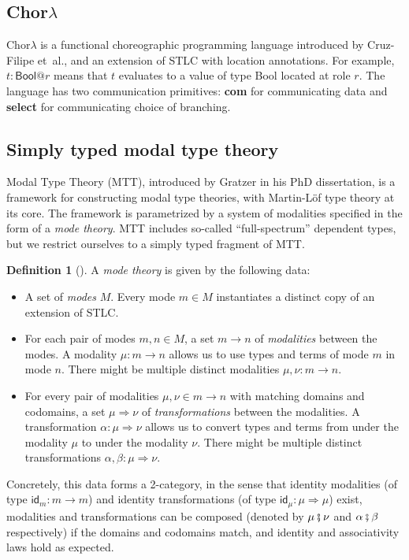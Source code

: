 \documentclass{scrartcl}
\theoremstyle{definition}
\newtheorem{definition}{Definition}
\theoremstyle{plain}
\newcommand{\primitive}[1]{\textsf{\textbf{#1}}}
\begin{document}
\subsection{\texorpdfstring{Chor$\lambda$}{ChorLambda}}
Chor$\lambda$\cite{cruz2022functional} is a functional choreographic
programming language introduced by Cruz-Filipe et~al., and an extension of STLC
with location annotations. For example, $t : \textsf{Bool} @ r$ means that $t$
evaluates to a value of type \textsf{Bool} located at role $r$. The language
has two communication primitives: \primitive{com} for communicating data and
\primitive{select} for communicating choice of branching.

\subsection{Simply typed modal type theory}
Modal Type Theory (MTT)\cite{gratzer2023syntax}, introduced by Gratzer in his
PhD dissertation, is a framework for constructing modal type theories, with
Martin-L\"{of} type theory at its core. The framework is parametrized by a
system of modalities specified in the form of a \emph{mode theory}. MTT
includes so-called ``full-spectrum'' dependent types, but we restrict ourselves
to a simply typed fragment of MTT.
\begin{definition}[{\cite[Chapter 6.1.1]{gratzer2023syntax}}]
  A \emph{mode theory} is given by the following data:
  \begin{itemize}
  \item
    A set of \emph{modes} $M$. Every mode $m \in M$ instantiates a distinct
    copy of an extension of STLC.
  \item
    For each pair of modes $m, n \in M$, a set $m \to n$ of \emph{modalities}
    between the modes. A modality $\mu : m \to n$ allows us to use types and
    terms of mode $m$ in mode $n$. There might be multiple distinct modalities
    $\mu , \nu : m \to n$.
  \item
    For every pair of modalities $\mu, \nu \in m \to n$ with matching domains
    and codomains, a set $\mu \Rightarrow \nu$ of \emph{transformations}
    between the modalities. A transformation $\alpha : \mu \Rightarrow \nu$
    allows us to convert types and terms from under the modality $\mu$ to under
    the modality $\nu$. There might be multiple distinct transformations
    $\alpha, \beta : \mu \Rightarrow \nu$.
  \end{itemize}
  Concretely, this data forms a 2-category, in the sense that identity
  modalities (of type $\textsf{id}_m : m \to m$) and identity transformations
  (of type $\textsf{id}_\mu : \mu \Rightarrow \mu $) exist, modalities and
  transformations can be composed (denoted by $\mu \fatsemi \nu$ and $\alpha
  \fatsemi \beta$ respectively) if the domains and codomains match, and
  identity and associativity laws hold as expected\cite{licata2016adjoint}.
\end{definition}
\end{document}
